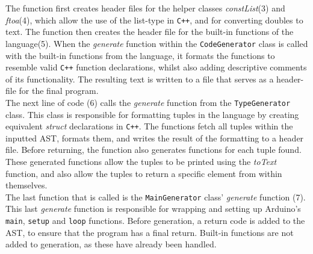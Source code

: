 The function first creates header files for the helper classes \textit{constList}(3) and \textit{ftoa}(4), which allow the use of the list-type in \texttt{C++}, and for converting doubles to text. 
The function then creates the header file for the built-in functions of the language(5).
When the \textit{generate} function within the \texttt{CodeGenerator} class is called with the built-in functions from the language, it formats the functions to resemble valid \texttt{C++} function declarations, whilst also adding descriptive comments of its functionality.
The resulting text is written to a file that serves as a header-file for the final program. \\
The next line of code (6) calls the \textit{generate} function from the \texttt{TypeGenerator} class.
This class is responsible for formatting tuples in the language by creating equivalent \textit{struct} declarations in \texttt{C++}.
The functions fetch all tuples within the inputted AST, formats them, and writes the result of the formatting to a header file.
Before returning, the function also generates functions for each tuple found.
These generated functions allow the tuples to be printed using the \textit{toText} function, and also allow the tuples to return a specific element from within themselves.\\
The last function that is called is the \texttt{MainGenerator} class' \textit{generate} function (7). 
This last \textit{generate} function is responsible for wrapping and setting up Arduino's \texttt{main}, \texttt{setup} and \texttt{loop} functions.
Before generation, a return code is added to the AST, to ensure that the program has a final return.
Built-in functions are not added to generation, as these have already been handled. 

